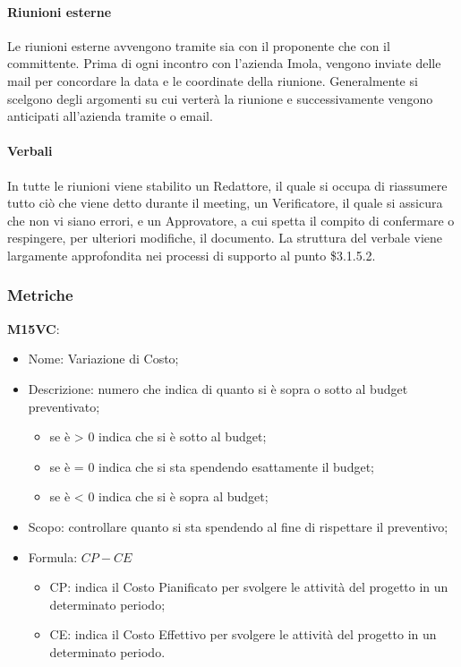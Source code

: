 \paragraph{Riunioni esterne} \hfill \break
Le riunioni esterne avvengono tramite  sia con il proponente che con il committente. Prima di ogni incontro con 
l'azienda Imola, vengono inviate delle mail per concordare la data e le coordinate della riunione. Generalmente si scelgono
degli argomenti su cui verterà la riunione e successivamente vengono anticipati all'azienda tramite  o email.

\paragraph{Verbali} \hfill \break
In tutte le riunioni viene stabilito un Redattore, il quale si occupa di riassumere tutto ciò che
viene detto durante il meeting, un Verificatore, il quale si assicura che non vi siano errori, e un Approvatore,
a cui spetta il compito di confermare o respingere, per ulteriori modifiche, il documento. La struttura del verbale viene 
largamente approfondita nei processi di supporto al punto \$3.1.5.2.

\subsubsection{Metriche}
\textbf{M15VC}:
\begin{itemize}
    \item Nome: Variazione di Costo;
    \item Descrizione: numero che indica di quanto si è sopra o sotto al budget preventivato;
         \begin{itemize}
            \item se è > 0 indica che si è sotto al budget;
            \item se è = 0 indica che si sta spendendo esattamente il budget;
            \item se è < 0 indica che si è sopra al budget;
        \end{itemize}
    \item Scopo: controllare quanto si sta spendendo al fine di rispettare il preventivo;
    \item Formula: $ CP - CE $
        \begin{itemize}
            \item CP: indica il Costo Pianificato per svolgere le attività del progetto in un determinato periodo;
            \item CE: indica il Costo Effettivo per svolgere le attività del progetto in un determinato periodo.
        \end{itemize}
\end{itemize}


